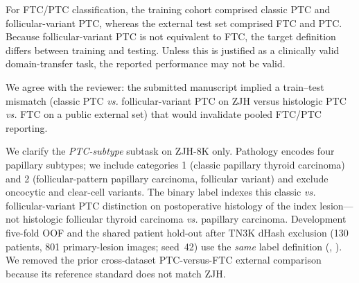 \begin{reviewercomment}
For FTC/PTC classification, the training cohort comprised classic PTC and follicular-variant PTC, whereas the external test set comprised FTC and PTC. Because follicular-variant PTC is not equivalent to FTC, the target definition differs between training and testing. Unless this is justified as a clinically valid domain-transfer task, the reported performance may not be valid.
\end{reviewercomment}
\begin{authorresponse}
We agree with the reviewer: the submitted manuscript implied a train--test mismatch (classic PTC \emph{vs.} follicular-variant PTC on ZJH versus histologic PTC \emph{vs.} FTC on a public external set) that would invalidate pooled FTC/PTC reporting.\par
We clarify the \emph{PTC-subtype} subtask on ZJH-8K only. Pathology encodes four papillary subtypes; we include categories 1 (classic papillary thyroid carcinoma) and 2 (follicular-pattern papillary carcinoma, follicular variant) and exclude oncocytic and clear-cell variants. The binary label indexes this classic \emph{vs.} follicular-variant PTC distinction on postoperative histology of the index lesion---not histologic follicular thyroid carcinoma \emph{vs.} papillary carcinoma. Development five-fold OOF and the shared patient hold-out after TN3K dHash exclusion (130 patients, 801 primary-lesion images; seed~42) use the \emph{same} label definition (, ). We removed the prior cross-dataset PTC-versus-FTC external comparison because its reference standard does not match ZJH.\par
\par
\end{authorresponse}

